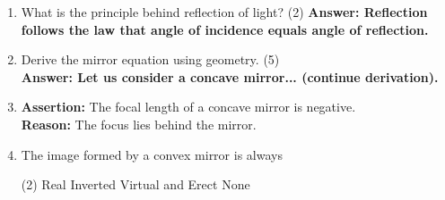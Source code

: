 \documentclass[11pt,a4paper]{extarticle}
\newcommand{\mcqquestion}[5]{%
  \item #1 \hfill \textbf{}%
  \begin{tasks}(2)
    \task #2
    \task #3
    \task #4
    \task #5
  \end{tasks}
}
\begin{document}
\begin{enumerate}
  \item What is the principle behind reflection of light? (2)
  \textbf{Answer: Reflection follows the law that angle of incidence equals angle of reflection.}

  \item Derive the mirror equation using geometry. (5)\\
  \textbf{Answer: Let us consider a concave mirror... (continue derivation).}

  \item \textbf{Assertion:} The focal length of a concave mirror is negative. \\
        \textbf{Reason:} The focus lies behind the mirror.

  \mcqquestion{The image formed by a convex mirror is always}{Real}{Inverted}{Virtual and Erect}{None}

\end{enumerate}

\end{document}
